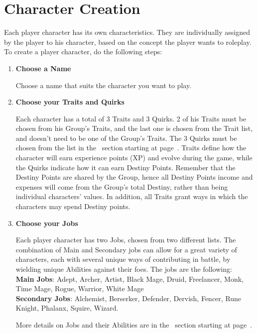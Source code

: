 \section{Character Creation}\label{sec:creation}
\begin{multicols}{2}
Each player character has its own characteristics. They are individually assigned by the player to his character, based on the concept the player wants to roleplay. To create a player character, do the following steps:
\begin{enumerate}
\item \textbf{Choose a Name}

Choose a name that suits the character you want to play.

\item \textbf{Choose your Traits and Quirks}

Each character has a total of 3 Traits and 3 Quirks. 2 of his Traits must be chosen from his Group’s Traits, and the last one is chosen from the Trait list, and doesn’t need to be one of the Group's Traits. The 3 Quirks must be chosen from the list in the~ section starting at page~\pageref{subsec:quirklist}. Traits define how the character will earn experience points (XP) and evolve during the game, while the Quirks indicate how it can earn Destiny Points. Remember that the Destiny Points are shared by the Group, hence all Destiny Points income and expenses will come from the Group's total Destiny, rather than being individual characters’ values. In addition, all Traits grant ways in which the characters may spend Destiny points.

\item \textbf{Choose your Jobs}

Each player character has two Jobs, chosen from two different lists. The combination of Main and Secondary jobs can allow for a great variety of characters, each with several unique ways of contributing in battle, by wielding unique Abilities against their foes. The jobs are the following: \\
\textbf{Main Jobs}: Adept, Archer, Artist, Black Mage, Druid, Freelancer, Monk, Time Mage, Rogue, Warrior, White Mage \\
\textbf{Secondary Jobs}: Alchemist, Berserker, Defender, Dervish, Fencer, Rune Knight, Phalanx, Squire, Wizard.

More details on Jobs and their Abilities are in the~ section starting at page~\pageref{sec:jobs-summary}.


\end{enumerate}
\end{multicols}
